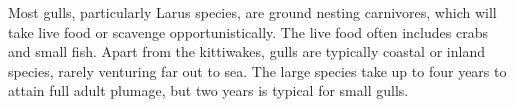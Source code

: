 \documentclass[a4paper,12pt]{article}
\begin{document}
Most gulls, particularly Larus species, are ground nesting carnivores,
which will take live food or scavenge opportunistically. The live food
often includes crabs and small fish. Apart from the kittiwakes, gulls
are typically coastal or inland species, rarely venturing far out to sea.
The large species take up to four years to attain full adult plumage,
but two years is typical for small gulls.
\end{document}
